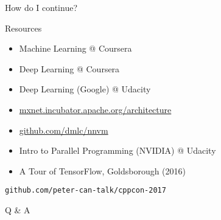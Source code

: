 
\begin{slide}{}
  \fontsize{32}{32}\selectfont
  \color{orange}
  How do I continue?
\end{slide}

\begin{slide}{Resources}
  \begin{itemize}
      \item Machine Learning @ Coursera
      \item Deep Learning @ Coursera
      \item Deep Learning (Google) @ Udacity
  \end{itemize}
  \pause
  \begin{itemize}
      \item \url{mxnet.incubator.apache.org/architecture}
      \item \url{github.com/dmlc/nnvm}
      \item Intro to Parallel Programming (NVIDIA) @ Udacity
      \item A Tour of TensorFlow, Goldsborough (2016)
  \end{itemize}
  \pause
  \vspace{0.75cm}
  {\large\texttt{github.com/peter-can-talk/cppcon-2017}}
\end{slide}

\begin{slide}{}
  \vspace{0.5cm}
  \fontsize{48}{48}\selectfont
  \color{orange}
  Q \& A
\end{slide}
